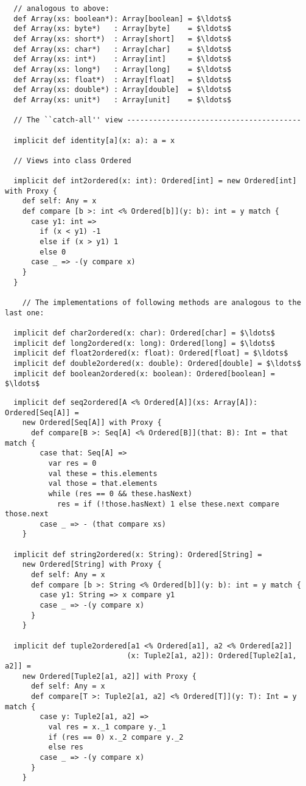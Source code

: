 {{{\begin{lstlisting}
  // analogous to above:
  def Array(xs: boolean*): Array[boolean] = $\ldots$
  def Array(xs: byte*)   : Array[byte]    = $\ldots$
  def Array(xs: short*)  : Array[short]   = $\ldots$
  def Array(xs: char*)   : Array[char]    = $\ldots$
  def Array(xs: int*)    : Array[int]     = $\ldots$
  def Array(xs: long*)   : Array[long]    = $\ldots$
  def Array(xs: float*)  : Array[float]   = $\ldots$
  def Array(xs: double*) : Array[double]  = $\ldots$
  def Array(xs: unit*)   : Array[unit]    = $\ldots$

  // The ``catch-all'' view ----------------------------------------

  implicit def identity[a](x: a): a = x

  // Views into class Ordered

  implicit def int2ordered(x: int): Ordered[int] = new Ordered[int] with Proxy {
    def self: Any = x
    def compare [b >: int <% Ordered[b]](y: b): int = y match {
      case y1: int =>
        if (x < y1) -1
        else if (x > y1) 1
        else 0
      case _ => -(y compare x)
    }
  }

    // The implementations of following methods are analogous to the last one:

  implicit def char2ordered(x: char): Ordered[char] = $\ldots$ 
  implicit def long2ordered(x: long): Ordered[long] = $\ldots$ 
  implicit def float2ordered(x: float): Ordered[float] = $\ldots$
  implicit def double2ordered(x: double): Ordered[double] = $\ldots$
  implicit def boolean2ordered(x: boolean): Ordered[boolean] = $\ldots$

\end{lstlisting}
\newpage
\begin{lstlisting}
  implicit def seq2ordered[A <% Ordered[A]](xs: Array[A]): Ordered[Seq[A]] = 
    new Ordered[Seq[A]] with Proxy {
      def compare[B >: Seq[A] <% Ordered[B]](that: B): Int = that match {
        case that: Seq[A] =>
          var res = 0
          val these = this.elements
          val those = that.elements
          while (res == 0 && these.hasNext)
            res = if (!those.hasNext) 1 else these.next compare those.next
        case _ => - (that compare xs)
    }

  implicit def string2ordered(x: String): Ordered[String] = 
    new Ordered[String] with Proxy {
      def self: Any = x
      def compare [b >: String <% Ordered[b]](y: b): int = y match {
        case y1: String => x compare y1
        case _ => -(y compare x)
      }
    }

  implicit def tuple2ordered[a1 <% Ordered[a1], a2 <% Ordered[a2]]
                            (x: Tuple2[a1, a2]): Ordered[Tuple2[a1, a2]] = 
    new Ordered[Tuple2[a1, a2]] with Proxy {
      def self: Any = x
      def compare[T >: Tuple2[a1, a2] <% Ordered[T]](y: T): Int = y match {
        case y: Tuple2[a1, a2] => 
          val res = x._1 compare y._1
          if (res == 0) x._2 compare y._2
          else res
        case _ => -(y compare x)
      }
    }


\end{lstlisting}}}}
